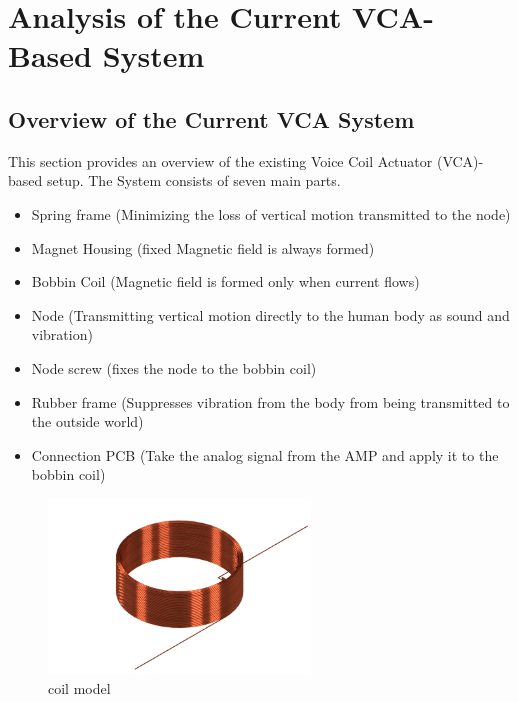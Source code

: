 \chapter{Analysis of the Current VCA-Based System}

\section{Overview of the Current VCA System}
This section provides an overview of the existing Voice Coil Actuator (VCA)-based setup. The System consists of seven main parts. 

\begin{itemize}
    \item Spring frame (Minimizing the loss of vertical motion transmitted to the node)
    \item Magnet Housing (fixed Magnetic field is always formed)
    \item Bobbin Coil (Magnetic field is formed only when current flows)
    \item Node (Transmitting vertical motion directly to the human body as sound and vibration)
    \item Node screw (fixes the node to the bobbin coil)
    \item Rubber frame (Suppresses vibration from the body from being transmitted to the outside world)
    \item Connection PCB (Take the analog signal from the AMP and apply it to the bobbin coil)
\end{itemize}

\begin{figure}[H]
    \centering
    \includegraphics[width=0.62\textwidth]{img/coil.png}
    \caption[coil model]{coil model}
    \label{fig:CoilModel}
\end{figure}

